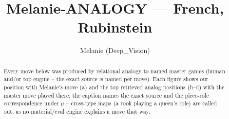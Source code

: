 \documentclass[11pt]{article}
\title{Melanie-ANALOGY — French, Rubinstein}
\author{Melanie (Deep\_Vision)}
\date{}
\begin{document}
\maketitle

\begin{abstract}Every move below was produced by relational analogy to named master games (human and/or top-engine -- the exact source is named per move). Each figure shows our position with Melanie's move (a) and the top retrieved analog positions (b--d) with the master move played there; the caption names the exact source and the piece-role correspondence under $\mu$ -- cross-type maps (a rook playing a queen's role) are called out, as no material/eval engine explains a move that way.\end{abstract}

\begin{figure}[p]\centering
\begin{subfigure}{0.46\textwidth}\centering
\resizebox{\linewidth}{!}{%
\newchessgame
\chessboard[
  setfen={r1bqkb1r/ppp2ppp/4pn2/8/3P4/5N2/PPP2PPP/R1BQKB1R w KQkq - 0 7},
  showmover=false,
  pgfstyle=straightmove, color=movearrow, markmove={f1-d3}
]}
\caption{}
\end{subfigure}\hfill
\begin{subfigure}{0.46\textwidth}\centering
\resizebox{\linewidth}{!}{%
\newchessgame
\chessboard[
  setfen={r1bqkb1r/ppp2ppp/4pn2/8/3P4/5N2/PPP2PPP/R1BQKB1R w KQkq - 0 7},
  showmover=false,
  pgfstyle=straightmove, color=movearrow, markmove={f1-d3}
]}
\caption{}
\end{subfigure}
\\[4pt]
\begin{subfigure}{0.46\textwidth}\centering
\resizebox{\linewidth}{!}{%
\newchessgame
\chessboard[
  setfen={r1bqkb1r/ppp2ppp/4pn2/8/3P4/5N2/PPP2PPP/R1BQKB1R w KQkq - 0 7},
  showmover=false,
  pgfstyle=straightmove, color=movearrow, markmove={f1-d3}
]}
\caption{}
\end{subfigure}\hfill
\begin{subfigure}{0.46\textwidth}\centering
\resizebox{\linewidth}{!}{%
\newchessgame
\chessboard[
  setfen={r1bqkb1r/ppp2ppp/4pn2/8/3P4/5N2/PPP2PPP/R1BQKB1R w KQkq - 0 7},
  showmover=false,
  pgfstyle=straightmove, color=movearrow, markmove={f1-d3}
]}
\caption{}
\end{subfigure}

\end{figure}
\end{document}
